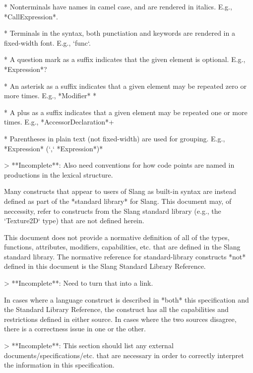 * Nonterminals have names in camel case, and are rendered in italics. E.g., *CallExpression*.

* Terminals in the syntax, both punctiation and keywords are rendered in a fixed-width font. E.g., `func`.

* A question mark as a suffix indicates that the given element is optional. E.g., *Expression*?

* An asterisk as a suffix indicates that a given element may be repeated zero or more times. E.g., *Modifier* *

* A plus as a suffix indicates that a given element may be repeated one or more times. E.g., *AccessorDeclaration*+

* Parentheses in plain text (not fixed-width) are used for grouping. E.g., *Expression* (`,` *Expression*)*

> **Incomplete**: Also need conventions for how code points are named in productions in the lexical structure.


Many constructs that appear to users of Slang as built-in syntax are instead defined as part of the *standard library* for Slang.
This document may, of neccessity, refer to constructs from the Slang standard library (e.g., the `Texture2D` type) that are not defined herein.

This document does not provide a normative definition of all of the types, functions, attributes, modifiers, capabilities, etc. that are defined in the Slang standard library.
The normative reference for standard-library constructs *not* defined in this document is the Slang Standard Library Reference.

> **Incomplete**: Need to turn that into a link.

In cases where a language construct is described in *both* this specification and the Standard Library Reference, the construct has all the capabilities and restrictions defined in either source.
In cases where the two sources disagree, there is a correctness issue in one or the other.


> **Incomplete**: This section should list any external documents/specifications/etc. that are necessary in order to correctly interpret the information in this specification.